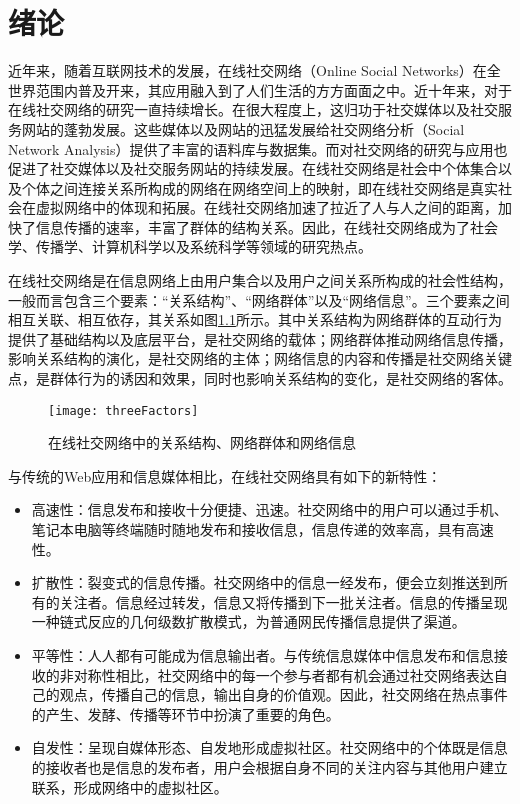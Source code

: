 \chapter{绪论}
\label{chap01}
近年来，随着互联网技术的发展，在线社交网络（Online Social Networks）在全世界范围内普及开来，其应用融入到了人们生活的方方面面之中。近十年来，对于在线社交网络的研究一直持续增长。在很大程度上，这归功于社交媒体以及社交服务网站的蓬勃发展。这些媒体以及网站的迅猛发展给社交网络分析（Social Network Analysis）提供了丰富的语料库与数据集。而对社交网络的研究与应用也促进了社交媒体以及社交服务网站的持续发展。在线社交网络是社会中个体集合以及个体之间连接关系所构成的网络在网络空间上的映射，即在线社交网络是真实社会在虚拟网络中的体现和拓展。在线社交网络加速了拉近了人与人之间的距离，加快了信息传播的速率，丰富了群体的结构关系。因此，在线社交网络成为了社会学、传播学、计算机科学以及系统科学等领域的研究热点。

在线社交网络是在信息网络上由用户集合以及用户之间关系所构成的社会性结构，一般而言包含三个要素：“关系结构”、“网络群体”以及“网络信息”。三个要素之间相互关联、相互依存，其关系如图\ref{fig:threeFactors}所示。其中关系结构为网络群体的互动行为提供了基础结构以及底层平台，是社交网络的载体；网络群体推动网络信息传播，影响关系结构的演化，是社交网络的主体；网络信息的内容和传播是社交网络关键点，是群体行为的诱因和效果，同时也影响关系结构的变化，是社交网络的客体。

\begin{figure}[!ht]
    \centering
    \texttt{[image: threeFactors]}
    \caption{在线社交网络中的关系结构、网络群体和网络信息}
    \label{fig:threeFactors}
\end{figure}

与传统的Web应用和信息媒体相比，在线社交网络具有如下的新特性：
\begin{itemize}
	\item 高速性：信息发布和接收十分便捷、迅速。社交网络中的用户可以通过手机、笔记本电脑等终端随时随地发布和接收信息，信息传递的效率高，具有高速性。
	\item 扩散性：裂变式的信息传播。社交网络中的信息一经发布，便会立刻推送到所有的关注者。信息经过转发，信息又将传播到下一批关注者。信息的传播呈现一种链式反应的几何级数扩散模式，为普通网民传播信息提供了渠道。
	\item 平等性：人人都有可能成为信息输出者。与传统信息媒体中信息发布和信息接收的非对称性相比，社交网络中的每一个参与者都有机会通过社交网络表达自己的观点，传播自己的信息，输出自身的价值观。因此，社交网络在热点事件的产生、发酵、传播等环节中扮演了重要的角色。
	\item 自发性：呈现自媒体形态、自发地形成虚拟社区。社交网络中的个体既是信息的接收者也是信息的发布者，用户会根据自身不同的关注内容与其他用户建立联系，形成网络中的虚拟社区。
\end{itemize}

